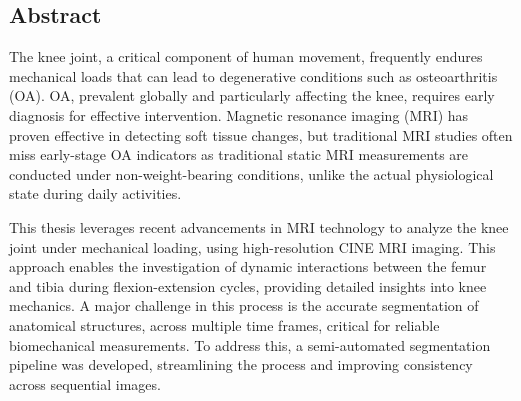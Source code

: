 \documentclass{micro-econ-thesis}
\begin{document}
\thesisDate{\today}
\thesisCompany{}

\thesisMakeTitle

\cleardoublepage
{}
\pagestyle{plain}
\subsection*{Abstract}

The knee joint, a critical component of human movement, frequently endures mechanical loads that can lead to degenerative conditions such as osteoarthritis (OA). OA, prevalent globally and particularly affecting the knee, requires early diagnosis for effective intervention. Magnetic resonance imaging (MRI) has proven effective in detecting soft tissue changes, but traditional MRI studies often miss early-stage OA indicators as traditional static MRI measurements are conducted under non-weight-bearing conditions, unlike the actual physiological state during daily activities.

This thesis leverages recent advancements in MRI technology to analyze the knee joint under mechanical loading, using high-resolution CINE MRI imaging. This approach enables the investigation of dynamic interactions between the femur and tibia during flexion-extension cycles, providing detailed insights into knee mechanics. A major challenge in this process is the accurate segmentation of anatomical structures, across multiple time frames, critical for reliable biomechanical measurements. To address this, a semi-automated segmentation pipeline was developed, streamlining the process and improving consistency across sequential images.
\end{document}

